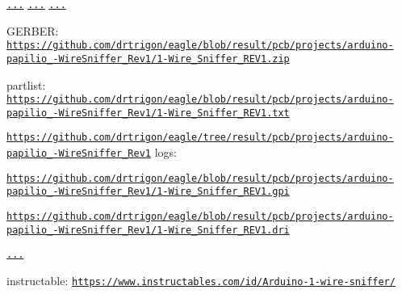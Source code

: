 \href{https://edrc.me/g/drtrigon/eagle}{\tt ...}  \href{https://github.com/drtrigon/eagle/blob/result/pcb/projects/arduino-papilio_1-WireSniffer_Rev1/1-Wire_Sniffer_REV1_brd.png}{\tt ...}  \href{https://github.com/drtrigon/eagle/blob/result/pcb/projects/arduino-papilio_1-WireSniffer_Rev1/1-Wire_Sniffer_REV1.png}{\tt ...}
\begin{DoxyItemize}
\item G\-E\-R\-B\-E\-R\-: \href{https://github.com/drtrigon/eagle/blob/result/pcb/projects/arduino-papilio_1-WireSniffer_Rev1/1-Wire_Sniffer_REV1.zip}{\tt https\-://github.\-com/drtrigon/eagle/blob/result/pcb/projects/arduino-\/papilio\-\_-\/\-Wire\-Sniffer\-\_\-\-Rev1/1-\/\-Wire\-\_\-\-Sniffer\-\_\-\-R\-E\-V1.\-zip}
\item partlist\-: \href{https://github.com/drtrigon/eagle/blob/result/pcb/projects/arduino-papilio_1-WireSniffer_Rev1/1-Wire_Sniffer_REV1.txt}{\tt https\-://github.\-com/drtrigon/eagle/blob/result/pcb/projects/arduino-\/papilio\-\_-\/\-Wire\-Sniffer\-\_\-\-Rev1/1-\/\-Wire\-\_\-\-Sniffer\-\_\-\-R\-E\-V1.\-txt}
\end{DoxyItemize}

\href{https://github.com/drtrigon/eagle/tree/result/pcb/projects/arduino-papilio_1-WireSniffer_Rev1}{\tt https\-://github.\-com/drtrigon/eagle/tree/result/pcb/projects/arduino-\/papilio\-\_-\/\-Wire\-Sniffer\-\_\-\-Rev1} logs\-:
\begin{DoxyItemize}
\item \href{https://github.com/drtrigon/eagle/blob/result/pcb/projects/arduino-papilio_1-WireSniffer_Rev1/1-Wire_Sniffer_REV1.gpi}{\tt https\-://github.\-com/drtrigon/eagle/blob/result/pcb/projects/arduino-\/papilio\-\_-\/\-Wire\-Sniffer\-\_\-\-Rev1/1-\/\-Wire\-\_\-\-Sniffer\-\_\-\-R\-E\-V1.\-gpi}
\item \href{https://github.com/drtrigon/eagle/blob/result/pcb/projects/arduino-papilio_1-WireSniffer_Rev1/1-Wire_Sniffer_REV1.dri}{\tt https\-://github.\-com/drtrigon/eagle/blob/result/pcb/projects/arduino-\/papilio\-\_-\/\-Wire\-Sniffer\-\_\-\-Rev1/1-\/\-Wire\-\_\-\-Sniffer\-\_\-\-R\-E\-V1.\-dri}
\end{DoxyItemize}

 \href{https://github.com/drtrigon/eagle/blob/result/pcb/projects/arduino-papilio_1-WireSniffer_Rev1/1-Wire_Sniffer_REV1_auto.png}{\tt ...}

instructable\-: \href{https://www.instructables.com/id/Arduino-1-wire-sniffer/}{\tt https\-://www.\-instructables.\-com/id/\-Arduino-\/1-\/wire-\/sniffer/}

